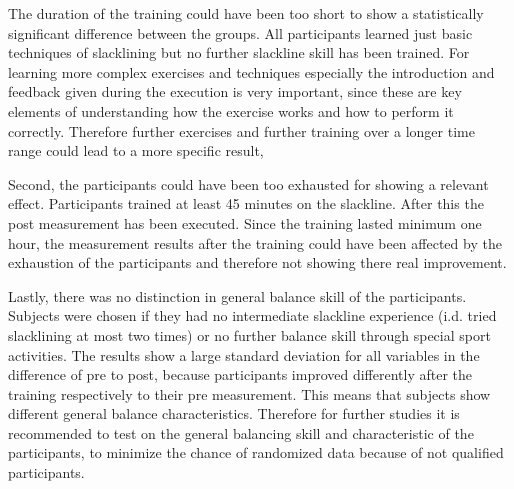 The duration of the training could have been too short to show a statistically significant difference between the groups.
All participants learned just basic techniques of slacklining but no further slackline skill has been trained.
For learning more complex exercises and techniques especially the introduction and feedback given during the execution is very important, since these are key elements of understanding how the exercise works and how to perform it correctly.
Therefore further exercises and further training over a longer time range  could lead to a more specific result, 

Second, the participants could have been too exhausted for showing a relevant effect.
Participants trained at least 45 minutes on the slackline.
After this the post measurement has been executed.
Since the training lasted minimum one hour, the measurement results after the training could have been affected by the exhaustion of the participants and therefore not showing there real improvement.



Lastly, there was no distinction in general balance skill of the participants.
Subjects were chosen if they had no intermediate slackline experience (i.d. tried slacklining at most two times) or no further balance skill through special sport activities.
The results show a large standard deviation for all variables in the difference of pre to post, because participants improved differently after the training respectively to their pre measurement.
This means that subjects show different general balance characteristics.
Therefore for further studies it is recommended to test on the general balancing skill and characteristic of the participants, to minimize the chance of randomized data because of not qualified participants.

